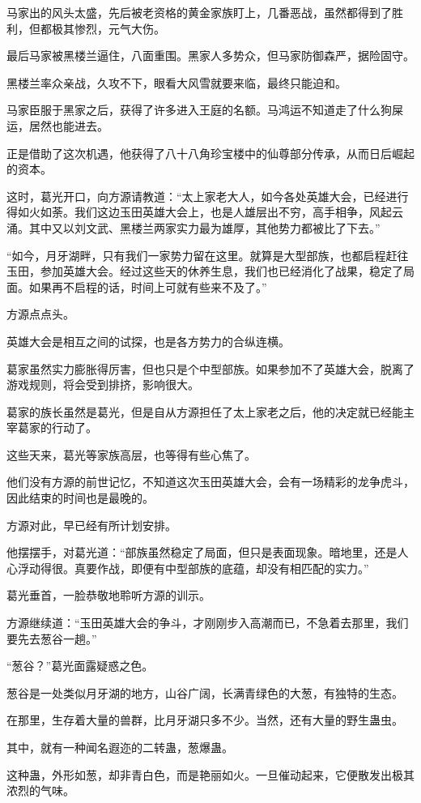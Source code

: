 \begin{this_body}
马家出的风头太盛，先后被老资格的黄金家族盯上，几番恶战，虽然都得到了胜利，但都极其惨烈，元气大伤。

最后马家被黑楼兰逼住，八面重围。黑家人多势众，但马家防御森严，据险固守。

黑楼兰率众亲战，久攻不下，眼看大风雪就要来临，最终只能迫和。

马家臣服于黑家之后，获得了许多进入王庭的名额。马鸿运不知道走了什么狗屎运，居然也能进去。

正是借助了这次机遇，他获得了八十八角珍宝楼中的仙尊部分传承，从而日后崛起的资本。

这时，葛光开口，向方源请教道：“太上家老大人，如今各处英雄大会，已经进行得如火如荼。我们这边玉田英雄大会上，也是人雄层出不穷，高手相争，风起云涌。其中又以刘文武、黑楼兰两家实力最为雄厚，其他势力都被比了下去。”

“如今，月牙湖畔，只有我们一家势力留在这里。就算是大型部族，也都启程赶往玉田，参加英雄大会。经过这些天的休养生息，我们也已经消化了战果，稳定了局面。如果再不启程的话，时间上可就有些来不及了。”

方源点点头。

英雄大会是相互之间的试探，也是各方势力的合纵连横。

葛家虽然实力膨胀得厉害，但也只是个中型部族。如果参加不了英雄大会，脱离了游戏规则，将会受到排挤，影响很大。

葛家的族长虽然是葛光，但是自从方源担任了太上家老之后，他的决定就已经能主宰葛家的行动了。

这些天来，葛光等家族高层，也等得有些心焦了。

他们没有方源的前世记忆，不知道这次玉田英雄大会，会有一场精彩的龙争虎斗，因此结束的时间也是最晚的。

方源对此，早已经有所计划安排。

他摆摆手，对葛光道：“部族虽然稳定了局面，但只是表面现象。暗地里，还是人心浮动得很。真要作战，即便有中型部族的底蕴，却没有相匹配的实力。”

葛光垂首，一脸恭敬地聆听方源的训示。

方源继续道：“玉田英雄大会的争斗，才刚刚步入高潮而已，不急着去那里，我们要先去葱谷一趟。”

“葱谷？”葛光面露疑惑之色。

葱谷是一处类似月牙湖的地方，山谷广阔，长满青绿色的大葱，有独特的生态。

在那里，生存着大量的兽群，比月牙湖只多不少。当然，还有大量的野生蛊虫。

其中，就有一种闻名遐迩的二转蛊，葱爆蛊。

这种蛊，外形如葱，却非青白色，而是艳丽如火。一旦催动起来，它便散发出极其浓烈的气味。


\end{this_body}

